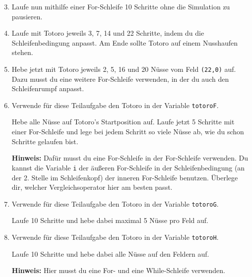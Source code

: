 \begin{enumerate}\setcounter{enumi}{2}
	\item
	Laufe nun mithilfe einer For-Schleife 10 Schritte ohne die Simulation zu pausieren.

	\item
	Laufe mit Totoro jeweils 3, 7, 14 und 22 Schritte, indem du die Schleifenbedingung anpasst.
	Am Ende sollte Totoro auf einem Nusshaufen stehen.
	
	\item
	Hebe jetzt mit Totoro jeweils 2, 5, 16 und 20 Nüsse vom Feld \texttt{(22,0)} auf.
	Dazu musst du eine weitere For-Schleife verwenden, in der du auch den Schleifenrumpf anpasst.
	
	\item
	Verwende für diese Teilaufgabe den Totoro in der Variable \lstinline{totoroF}.
	
	Hebe alle Nüsse auf Totoro's Startposition auf.
	Laufe jetzt 5 Schritte mit einer For-Schleife und lege bei jedem Schritt so viele Nüsse ab, wie du schon Schritte gelaufen bist.
	
	\textbf{Hinweis:} Dafür musst du eine For-Schleife in der For-Schleife verwenden.
	Du kannst die Variable \lstinline{i} der äußeren For-Schleife in der Schleifenbedingung (an der 2. Stelle im Schleifenkopf) der inneren For-Schleife benutzen.
	Überlege dir, welcher Vergleichsoperator hier am besten passt.
	
	\item
	Verwende für diese Teilaufgabe den Totoro in der Variable \lstinline{totoroG}.
	
	Laufe 10 Schritte und hebe dabei maximal 5 Nüsse pro Feld auf.
	
	\item
	Verwende für diese Teilaufgabe den Totoro in der Variable \lstinline{totoroH}.
	
	Laufe 10 Schritte und hebe dabei alle Nüsse auf den Feldern auf.
	
	\textbf{Hinweis:} Hier musst du eine For- und eine While-Schleife verwenden.
\end{enumerate}
\newpage

